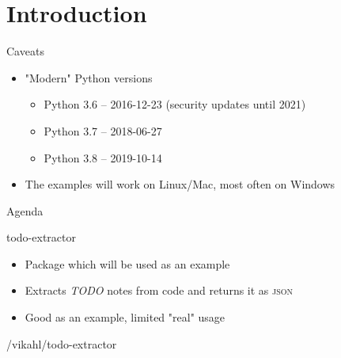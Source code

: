 {
\section*{Introduction}
}



\begin{frame}{Caveats}
  \begin{itemize}
    \item "Modern" Python versions
      \begin{itemize}
        \item Python 3.6 -- 2016-12-23 (security updates until 2021)
        \item Python 3.7 -- 2018-06-27
        \item Python 3.8 -- 2019-10-14
      \end{itemize}
    \item The examples will work on Linux/Mac, most often on Windows
  \end{itemize}
\end{frame}


\begin{frame}{Agenda}
  \setcounter{tocdepth}{1}
  \tableofcontents
\end{frame}

\begin{frame}{todo-extractor}
  \begin{itemize}
    \item Package which will be used as an example
    \item Extracts \textit{TODO} notes from code and returns it as \textsc{json}
    \item Good as an example, limited "real" usage
  \end{itemize}

  /vikahl/todo-extractor

\end{frame}
